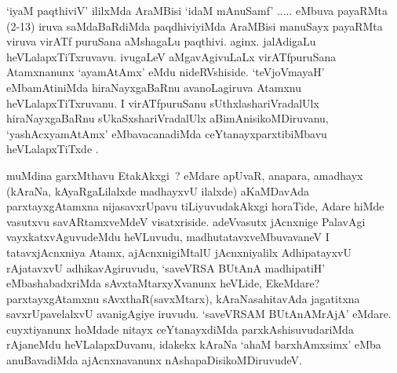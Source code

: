 \centerline{}

\begin{artha}
`iyaM paqthiviV' ililxMda AraMBisi `idaM mAnuSamf' ..... eMbuva payaRMta (2-13) iruva saMdaBaRdiMda paqdhiviyiMda AraMBisi manuSayx payaRMta viruva virATf puruSana aMshagaLu paqthivi. aginx. jalAdigaLu 	 heVLalapxTiTxruvavu. ivugaLeV aMgavAgivuLaLx virATfpuruSana Atamxnanunx  `ayamAtAmx' eMdu nideRVshiside. `teVjoVmayaH' eMbamAtiniMda hiraNayxgaBaRnu avanoLagiruva Atamxnu heVLalapxTiTxruvanu. I virATfpuruSanu sUthxlashariVradalUlx hiraNayxgaBaRnu sUkaSxshariVradalUlx aBimAnisikoMDiruvanu, `yashAcxyamAtAmx' eMbavacanadiMda ceYtanayxparxtibiMbavu heVLalapxTiTxde .
\end{artha}

\begin{artha}
 muMdina garxMthavu EtakAkxgi~? eMdare apUvaR, anapara, amadhayx (kAraNa, kAyaRgaLilalxde madhayxvU ilalxde) aKaMDavAda parxtayxgAtamxna nijasavxrUpavu tiLiyuvudakAkxgi horaTide, Adare hiMde vasutxvu savARtamxveMdeV visatxriside. adeVvasutx jAcnxnige PalavAgi vayxkatxvAguvudeMdu heVLuvudu, madhutatavxveMbuvavaneV I tatavxjAcnxniya Atamx, ajAcnxnigiMtalU jAcnxniyalilx AdhipatayxvU rAjatavxvU adhikavAgiruvudu, `saveVRSA BUtAnA madhipatiH' eMbashabadxriMda sAvxtaMtarxyXvanunx heVLide, EkeMdare? parxtayxgAtamxnu sAvxthaR(savxMtarx), kAraNasahitavAda jagatitxna savxrUpavelalxvU avanigAgiye iruvudu. 
 `saveVRSAM BUtAnAMrAjA' eMdare. cuyxtiyanunx hoMdade nitayx ceYtanayxdiMda parxkAshisuvudariMda rAjaneMdu heVLalapxDuvanu, idakekx kAraNa `ahaM barxhAmxsimx' eMba anuBavadiMda ajAcnxnavanunx nAshapaDisikoMDiruvudeV.
\end{artha}

